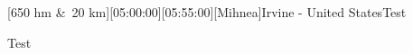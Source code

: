 \begin{minipage}{\textwidth}[650 hm \&~20 km][05:00:00][05:55:00][Mihnea]{Irvine - United States}\label{2018-06-10-Hot Springs}Test




















 Test



















\end{minipage}
